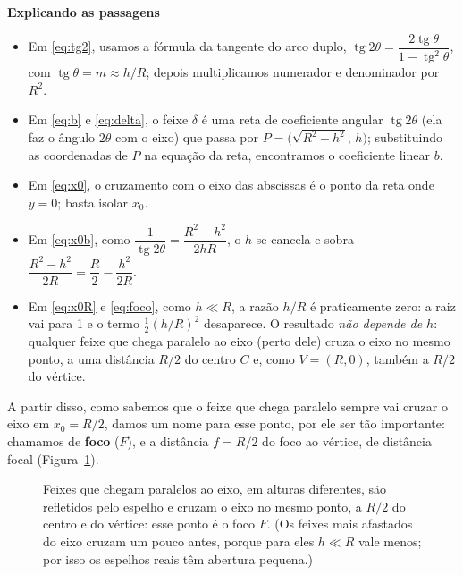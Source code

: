 \documentclass[11pt,a4paper]{article}
\DeclareMathOperator{\tg}{tg}
\newcommand{\titulocaixa}[1]{{\sffamily\bfseries\color{caixatitulo}#1}}
\begin{document}
\begin{comentario}
  \titulocaixa{Explicando as passagens}
  \begin{itemize}[leftmargin=12pt,labelsep=6pt]
    \item Em \eqref{eq:tg2}, usamos a fórmula da tangente do arco duplo,
      $\tg 2\theta = \dfrac{2\tg\theta}{1 - \tg^2\theta}$, com
      $\tg\theta = m \approx h/R$; depois multiplicamos numerador e denominador
      por $R^2$.
    \item Em \eqref{eq:b} e \eqref{eq:delta}, o feixe $\delta$ é uma reta de
      coeficiente angular $\tg 2\theta$ (ela faz o ângulo $2\theta$ com o eixo)
      que passa por $P = \bigl(\sqrt{R^2 - h^2},\, h\bigr)$; substituindo as
      coordenadas de $P$ na equação da reta, encontramos o coeficiente linear
      $b$.
    \item Em \eqref{eq:x0}, o cruzamento com o eixo das abscissas é o ponto da
      reta onde $y = 0$; basta isolar $x_0$.
    \item Em \eqref{eq:x0b}, como $\dfrac{1}{\tg 2\theta} = \dfrac{R^2 - h^2}{2hR}$,
      o $h$ se cancela e sobra $\dfrac{R^2 - h^2}{2R} = \dfrac{R}{2} - \dfrac{h^2}{2R}$.
    \item Em \eqref{eq:x0R} e \eqref{eq:foco}, como $h \ll R$, a razão $h/R$ é
      praticamente zero: a raiz vai para 1 e o termo $\frac{1}{2}(h/R)^2$
      desaparece. O resultado \emph{não depende de $h$}: qualquer feixe que chega
      paralelo ao eixo (perto dele) cruza o eixo no mesmo ponto, a uma distância
      $R/2$ do centro $C$ e, como $V = (R, 0)$, também a $R/2$ do vértice.
  \end{itemize}
\end{comentario}

A partir disso, como sabemos que o feixe que chega paralelo sempre vai cruzar o
eixo em $x_0 = R/2$, damos um nome para esse ponto, por ele ser tão importante:
chamamos de \textbf{foco} ($F$), e a distância $f = R/2$ do foco ao vértice, de
distância focal (Figura~\ref{fig:foco}).

\begin{figure}[H]
  \centering
  \begin{minipage}[c]{0.48\textwidth}
    \centering
    \begingroup{}%
    \endgroup
  \end{minipage}\hfill
  \begin{minipage}[c]{0.48\textwidth}
    \captionsetup{margin=0pt}
    \caption{Feixes que chegam paralelos ao eixo, em alturas diferentes, são
    refletidos pelo espelho e cruzam o eixo no mesmo ponto, a $R/2$ do centro e
    do vértice: esse ponto é o foco $F$. (Os feixes mais afastados do eixo cruzam
    um pouco antes, porque para eles $h \ll R$ vale menos; por isso os espelhos
    reais têm abertura pequena.)}
    \label{fig:foco}
  \end{minipage}
\end{figure}
\end{document}
